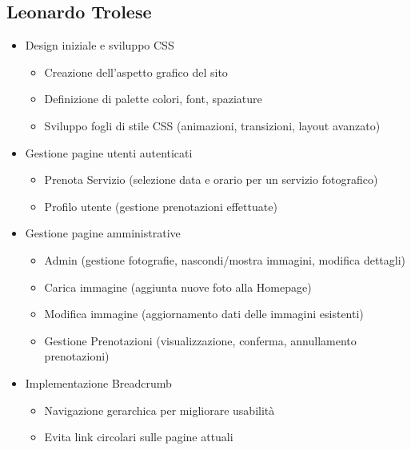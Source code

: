 \subsection{Leonardo Trolese}
\begin{itemize}
    \item Design iniziale e sviluppo CSS
    \begin{itemize}
        \item Creazione dell’aspetto grafico del sito
        \item Definizione di palette colori, font, spaziature
        \item Sviluppo fogli di stile CSS (animazioni, transizioni, layout avanzato)
    \end{itemize}
    \item Gestione pagine utenti autenticati
    \begin{itemize}
        \item Prenota Servizio (selezione data e orario per un servizio fotografico)
        \item Profilo utente (gestione prenotazioni effettuate)
    \end{itemize}
    \item Gestione pagine amministrative
    \begin{itemize}
        \item Admin (gestione fotografie, nascondi/mostra immagini, modifica dettagli)
        \item Carica immagine (aggiunta nuove foto alla Homepage)
        \item Modifica immagine (aggiornamento dati delle immagini esistenti)
        \item Gestione Prenotazioni (visualizzazione, conferma, annullamento prenotazioni)
    \end{itemize}
    \item Implementazione Breadcrumb
    \begin{itemize}
        \item Navigazione gerarchica per migliorare usabilità
        \item Evita link circolari sulle pagine attuali
    \end{itemize}
\end{itemize}

